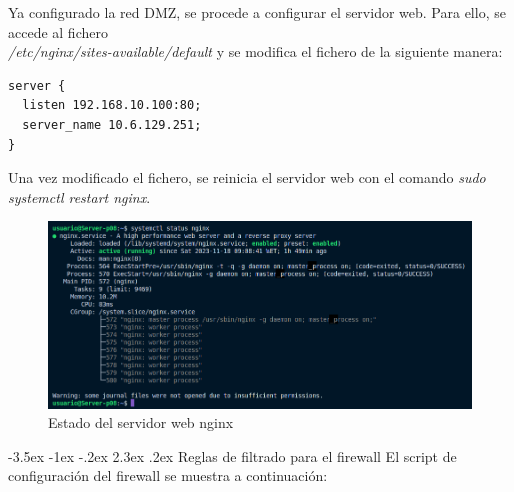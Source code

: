 \documentclass[11pt]{report} %
\makeatletter
\renewcommand\chapter{\@startsection{chapter}{0}{\z@}%
    {-3.5ex \@plus -1ex \@minus -.2ex}%
    {2.3ex \@plus.2ex}%
    {\normalfont\Large\bfseries}}
\makeatother
\begin{document}
Ya configurado la red DMZ, se procede a configurar el servidor web. Para ello, se accede al fichero \\
\emph{/etc/nginx/sites-available/default} y se modifica el fichero de la siguiente manera:

\begin{verbatim}
server {
  listen 192.168.10.100:80;
  server_name 10.6.129.251;
}
\end{verbatim}

Una vez modificado el fichero, se reinicia el servidor web con el comando \emph{sudo systemctl restart nginx}.

\begin{figure}[H]
  \centering
  \includegraphics[scale=0.4]{img/nginx_status.png}
  \caption{Estado del servidor web nginx}
  \label{fig:estado del servidor web nginx}
\end{figure}

\cleardoublepage

\chapter{Reglas de filtrado para el firewall}
El script de configuración del firewall se muestra a continuación:
\end{document}
